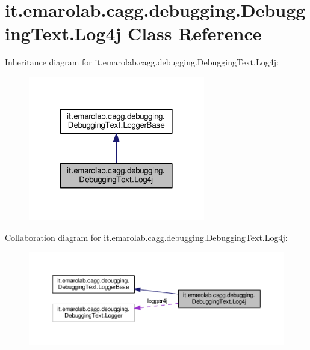 \hypertarget{classit_1_1emarolab_1_1cagg_1_1debugging_1_1DebuggingText_1_1Log4j}{\section{it.\-emarolab.\-cagg.\-debugging.\-Debugging\-Text.\-Log4j Class Reference}
\label{classit_1_1emarolab_1_1cagg_1_1debugging_1_1DebuggingText_1_1Log4j}
}


Inheritance diagram for it.\-emarolab.\-cagg.\-debugging.\-Debugging\-Text.\-Log4j\-:\nopagebreak
\begin{figure}[H]
\begin{center}
\leavevmode
\includegraphics[width=218pt]{classit_1_1emarolab_1_1cagg_1_1debugging_1_1DebuggingText_1_1Log4j__inherit__graph}
\end{center}
\end{figure}


Collaboration diagram for it.\-emarolab.\-cagg.\-debugging.\-Debugging\-Text.\-Log4j\-:
\nopagebreak
\begin{figure}[H]
\begin{center}
\leavevmode
\includegraphics[width=350pt]{classit_1_1emarolab_1_1cagg_1_1debugging_1_1DebuggingText_1_1Log4j__coll__graph}
\end{center}
\end{figure}
